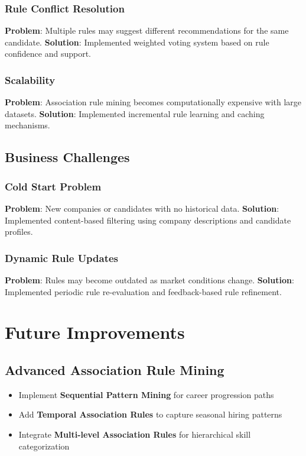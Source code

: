 \documentclass[12pt,a4paper]{article}
\begin{document}
\subsubsection{Rule Conflict Resolution}
\textbf{Problem}: Multiple rules may suggest different recommendations for the same candidate.
\textbf{Solution}: Implemented weighted voting system based on rule confidence and support.

\subsubsection{Scalability}
\textbf{Problem}: Association rule mining becomes computationally expensive with large datasets.
\textbf{Solution}: Implemented incremental rule learning and caching mechanisms.

\subsection{Business Challenges}

\subsubsection{Cold Start Problem}
\textbf{Problem}: New companies or candidates with no historical data.
\textbf{Solution}: Implemented content-based filtering using company descriptions and candidate profiles.

\subsubsection{Dynamic Rule Updates}
\textbf{Problem}: Rules may become outdated as market conditions change.
\textbf{Solution}: Implemented periodic rule re-evaluation and feedback-based rule refinement.

\section{Future Improvements}

\subsection{Advanced Association Rule Mining}
\begin{itemize}
    \item Implement \textbf{Sequential Pattern Mining} for career progression paths
    \item Add \textbf{Temporal Association Rules} to capture seasonal hiring patterns
    \item Integrate \textbf{Multi-level Association Rules} for hierarchical skill categorization
\end{itemize}
\end{document}
